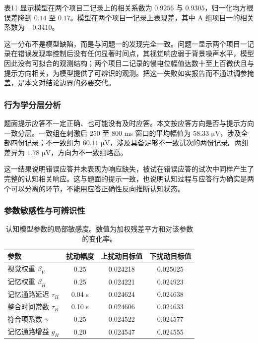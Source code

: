 \documentclass[bwprint]{gmcmthesis}
\begin{document}
表11 显示模型在两个项目二记录上的相关系数为 $0.9256$ 与 $0.9305$，归一化均方根误差降到 $0.14$ 至 $0.17$。模型在两个项目一记录上表现差，其中 A 组项目一的相关系数为 $-0.3410$。

这一分布不是模型缺陷，而是与问题一的发现完全一致。问题一显示两个项目一记录在错误发现率控制后没有任何显著时间点，其视觉响应弱于背景噪声水平，模型因此没有可拟合的观测结构；两个项目二记录的慢电位幅值达数十至上百微伏且与提示方向相关，为模型提供了可辨识的观测。把这一失败如实报告而不通过调参掩盖，是本文对结论边界的必要交代。

\subsubsection{行为学分层分析}

题面提示应答不一定正确、也可能没有及时应答。本文按应答方向是否与提示方向一致分层。一致组在刺激后 $250$ 至 $800$ ms 窗口的平均幅值为 $58.33$ $\si{\micro\volt}$，涉及全部四份记录；不一致组为 $60.11$ $\si{\micro\volt}$，涉及具备足够不一致试次的两份记录。两组差异为 $1.78$ $\si{\micro\volt}$，方向为不一致组略高。

这一结果说明错误应答并未表现为响应缺失，被试在错误应答的试次中同样产生了完整的认知相关响应。这与题面的提示一致，也说明认知过程与应答行为确实是两个可以分离的环节，不能用应答正确性反向推断认知状态。

\subsubsection{参数敏感性与可辨识性}

\begin{table}[htp!]
\centering
\renewcommand\arraystretch{1.2}
\caption{认知模型参数的局部敏感度。数值为加权残差平方和对该参数的变化率。}
\begin{tabular}{|l|c|c|c|}
  \hline
  参数 & 扰动幅度 & 上扰动目标值 & 下扰动目标值 \\
  \hline
  视觉权重 $\beta_V$ & 0.25 & 0.024218 & 0.025025 \\
  \hline
  记忆权重 $\beta_H$ & 0.25 & 0.024221 & 0.024923 \\
  \hline
  记忆通路延迟 $\tau_H$ & 0.04 s & 0.024624 & 0.024638 \\
  \hline
  整合时间常数 $\tau_R$ & 0.10 s & 0.024606 & 0.024633 \\
  \hline
  符合项系数 $\gamma$ & 0.25 & 0.024522 & 0.024577 \\
  \hline
  记忆通路增益 $g_H$ & 0.20 & 0.024547 & 0.024555 \\
  \hline
\end{tabular}
\end{table}
\end{document}
